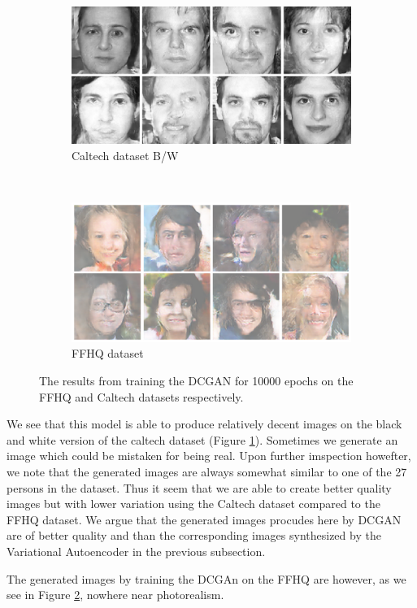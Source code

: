 \begin{figure}[h!]
    \centering
    \begin{subfigure}[b]{0.45\textwidth}
        \includegraphics[width=\textwidth]{fig/dcgan/caltech/epoch10000}
        \caption{Caltech dataset B/W}
        \label{dcgan-caltech}
    \end{subfigure}
    ~
    \begin{subfigure}[b]{0.45\textwidth}
        \includegraphics[width=\textwidth]{fig/dcgan/ffhq/epoch10000}
        \caption{FFHQ dataset}
        \label{dcgan-ffhq}
    \end{subfigure}
    \caption{The results from training the DCGAN for 10000 epochs on the FFHQ and Caltech datasets respectively.}
    \label{dcgan-results}
\end{figure}

We see that this model is able to produce relatively decent images on the black and white version of the caltech dataset (Figure \ref{dcgan-caltech}). Sometimes we generate an image which could be mistaken for being real. Upon further imspection howefter, we note that the generated images are always somewhat similar to one of the 27 persons in the dataset. Thus it seem that we are able to create better quality images but with lower variation using the Caltech dataset compared to the FFHQ dataset. We argue that the generated images procudes here by DCGAN are of better quality and than the corresponding images synthesized by the Variational Autoencoder in the previous subsection. 

The generated images by training the DCGAn on the FFHQ are however, as we see in Figure \ref{dcgan-ffhq}, nowhere near photorealism. 
